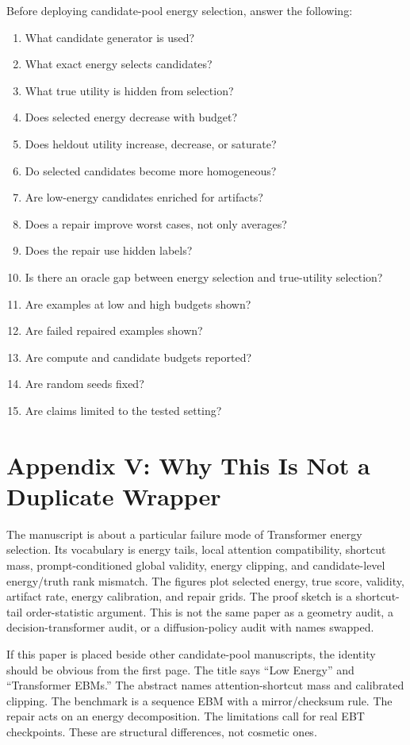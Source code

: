 \documentclass{article}
\begin{document}
Before deploying candidate-pool energy selection, answer the following:
\begin{enumerate}
  \item What candidate generator is used?
  \item What exact energy selects candidates?
  \item What true utility is hidden from selection?
  \item Does selected energy decrease with budget?
  \item Does heldout utility increase, decrease, or saturate?
  \item Do selected candidates become more homogeneous?
  \item Are low-energy candidates enriched for artifacts?
  \item Does a repair improve worst cases, not only averages?
  \item Does the repair use hidden labels?
  \item Is there an oracle gap between energy selection and true-utility
  selection?
  \item Are examples at low and high budgets shown?
  \item Are failed repaired examples shown?
  \item Are compute and candidate budgets reported?
  \item Are random seeds fixed?
  \item Are claims limited to the tested setting?
\end{enumerate}

\section{Appendix V: Why This Is Not a Duplicate Wrapper}

The manuscript is about a particular failure mode of Transformer energy
selection. Its vocabulary is energy tails, local attention compatibility,
shortcut mass, prompt-conditioned global validity, energy clipping, and
candidate-level energy/truth rank mismatch. The figures plot selected energy,
true score, validity, artifact rate, energy calibration, and repair grids. The
proof sketch is a shortcut-tail order-statistic argument. This is not the same
paper as a geometry audit, a decision-transformer audit, or a diffusion-policy
audit with names swapped.

If this paper is placed beside other candidate-pool manuscripts, the identity
should be obvious from the first page. The title says ``Low Energy'' and
``Transformer EBMs.'' The abstract names attention-shortcut mass and calibrated
clipping. The benchmark is a sequence EBM with a mirror/checksum rule. The
repair acts on an energy decomposition. The limitations call for real EBT
checkpoints. These are structural differences, not cosmetic ones.
\end{document}
